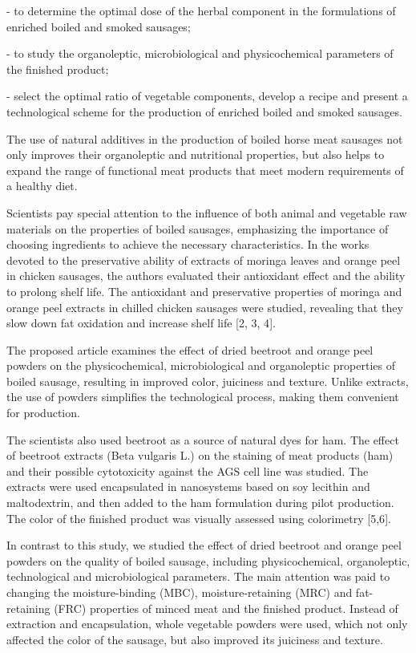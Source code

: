 \begin{multicols}{2}
- to determine the optimal dose of the herbal component in the
formulations of enriched boiled and smoked sausages;

- to study the organoleptic, microbiological and physicochemical
parameters of the finished product;

- select the optimal ratio of vegetable components, develop a recipe and
present a technological scheme for the production of enriched boiled and
smoked sausages.

The use of natural additives in the production of boiled horse meat
sausages not only improves their organoleptic and nutritional
properties, but also helps to expand the range of functional meat
products that meet modern requirements of a healthy diet.

Scientists pay special attention to the influence of both animal and
vegetable raw materials on the properties of boiled sausages,
emphasizing the importance of choosing ingredients to achieve the
necessary characteristics. In the works devoted to the preservative
ability of extracts of moringa leaves and orange peel in chicken
sausages, the authors evaluated their antioxidant effect and the ability
to prolong shelf life. The antioxidant and preservative properties of
moringa and orange peel extracts in chilled chicken sausages were
studied, revealing that they slow down fat oxidation and increase shelf
life {[}2, 3, 4{]}.

The proposed article examines the effect of dried beetroot and orange
peel powders on the physicochemical, microbiological and organoleptic
properties of boiled sausage, resulting in improved color, juiciness and
texture. Unlike extracts, the use of powders simplifies the
technological process, making them convenient for production.

The scientists also used beetroot as a source of natural dyes for ham.
The effect of beetroot extracts (Beta vulgaris L.) on the staining of
meat products (ham) and their possible cytotoxicity against the AGS cell
line was studied. The extracts were used encapsulated in nanosystems
based on soy lecithin and maltodextrin, and then added to the ham
formulation during pilot production. The color of the finished product
was visually assessed using colorimetry {[}5,6{]}.

In contrast to this study, we studied the effect of dried beetroot and
orange peel powders on the quality of boiled sausage, including
physicochemical, organoleptic, technological and microbiological
parameters. The main attention was paid to changing the moisture-binding
(MBC), moisture-retaining (MRC) and fat-retaining (FRC) properties of
minced meat and the finished product. Instead of extraction and
encapsulation, whole vegetable powders were used, which not only
affected the color of the sausage, but also improved its juiciness and
texture.


\end{multicols}
